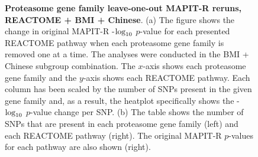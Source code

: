 \documentclass[12pt,a4paper]{article}
\def\log{{\rm log}}
\begin{document}
\begin{figure}[ht]
\centering
\vspace*{-.5cm}
\par
{}
\caption[TBD]{\textbf{Proteasome gene family leave-one-out MAPIT-R reruns, REACTOME + BMI + Chinese}. (a) The figure shows the change in original MAPIT-R -$\log_{10}$ $p$-value for each presented REACTOME pathway when each proteasome gene family is removed one at a time. The analyses were conducted in the BMI + Chinese subgroup combination. The $x$-axis shows each proteasome gene family and the $y$-axis shows each REACTOME pathway. Each column has been scaled by the number of SNPs present in the given gene family and, as a result, the heatplot specifically shows the -$\log_{10}$ $p$-value change per SNP. (b) The table shows the number of SNPs that are present in each proteasome gene family (left) and each REACTOME pathway (right). The original MAPIT-R $p$-values for each pathway are also shown (right).}
\label{InterPath-Supp-Figure-Prot-Heatplots-Chinese}
\end{figure}
\end{document}
